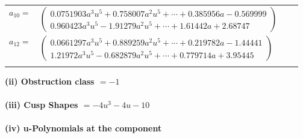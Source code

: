 \documentclass[1p]{elsarticle_modified}
\theoremstyle{definition}
\begin{document}
\begin{tabular}{m{7pt} m{180pt} m{7pt} m{180pt} }
\flushright $a_{10}=$&$\begin{pmatrix}0.0751903 a^{3} u^{5}+0.758007 a^{2} u^{5}+\cdots+0.385956 a-0.569999\\0.960423 a^{3} u^{5}-1.91279 a^{2} u^{5}+\cdots+1.61442 a+2.68747\end{pmatrix}$ \\
\flushright $a_{12}=$&$\begin{pmatrix}0.0661297 a^{3} u^{5}+0.889259 a^{2} u^{5}+\cdots+0.219782 a-1.44441\\1.21972 a^{3} u^{5}-0.682879 a^{2} u^{5}+\cdots+0.779714 a+3.95445\end{pmatrix}$\\&\end{tabular}
\flushleft \textbf{(ii) Obstruction class $= -1$}\\~\\
\flushleft \textbf{(iii) Cusp Shapes $= -4 u^3-4 u-10$}\\~\\
\newpage\renewcommand{\arraystretch}{1}
\flushleft \textbf{(iv) u-Polynomials at the component}\newline \\
\end{document}
